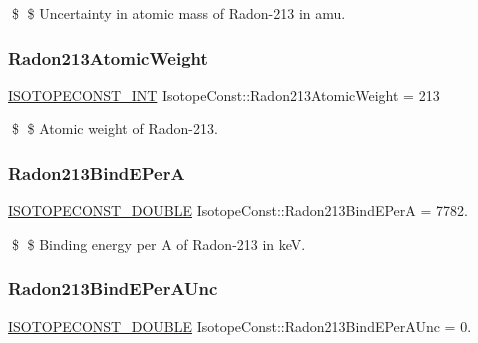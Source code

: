 \$ \$ Uncertainty in atomic mass of Radon-\/213 in amu. \mbox{\label{group___isotope_const-_radon-_rn213_ga8e53006a97ef742d435bea70109ade5e}} 
\subsubsection{\texorpdfstring{Radon213\+Atomic\+Weight}{Radon213AtomicWeight}}
{\footnotesize\ttfamily \mbox{\hyperlink{group___isotope_const-_macros_ga5f18360b3e99483a35c32d789e62621c}{I\+S\+O\+T\+O\+P\+E\+C\+O\+N\+S\+T\+\_\+\+I\+NT}} Isotope\+Const\+::\+Radon213\+Atomic\+Weight = 213}

\$ \$ Atomic weight of Radon-\/213. \mbox{\label{group___isotope_const-_radon-_rn213_ga5663dccc4bdefeb9166d91fc0e94c20e}} 
\subsubsection{\texorpdfstring{Radon213\+Bind\+E\+PerA}{Radon213BindEPerA}}
{\footnotesize\ttfamily \mbox{\hyperlink{group___isotope_const-_macros_ga8f45a7272ce02c0b4c65c44636ed719a}{I\+S\+O\+T\+O\+P\+E\+C\+O\+N\+S\+T\+\_\+\+D\+O\+U\+B\+LE}} Isotope\+Const\+::\+Radon213\+Bind\+E\+PerA = 7782.}

\$ \$ Binding energy per A of Radon-\/213 in keV. \mbox{\label{group___isotope_const-_radon-_rn213_ga79522dd4d5a9618a5400d06187a079fb}} 
\subsubsection{\texorpdfstring{Radon213\+Bind\+E\+Per\+A\+Unc}{Radon213BindEPerAUnc}}
{\footnotesize\ttfamily \mbox{\hyperlink{group___isotope_const-_macros_ga8f45a7272ce02c0b4c65c44636ed719a}{I\+S\+O\+T\+O\+P\+E\+C\+O\+N\+S\+T\+\_\+\+D\+O\+U\+B\+LE}} Isotope\+Const\+::\+Radon213\+Bind\+E\+Per\+A\+Unc = 0.}

